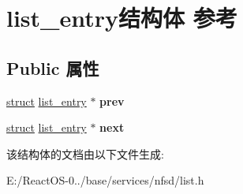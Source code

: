 \hypertarget{structlist__entry}{}\section{list\+\_\+entry结构体 参考}
\label{structlist__entry}
\subsection*{Public 属性}
\begin{DoxyCompactItemize}
\item 
\mbox{\label{structlist__entry_aa400c402bee52d2ccf9cbf834276ce85}} 
\hyperlink{interfacestruct}{struct} \hyperlink{structlist__entry}{list\+\_\+entry} $\ast$ {\bfseries prev}
\item 
\mbox{\label{structlist__entry_a0b1439db2d6f56fac7b7c87fb6261cb9}} 
\hyperlink{interfacestruct}{struct} \hyperlink{structlist__entry}{list\+\_\+entry} $\ast$ {\bfseries next}
\end{DoxyCompactItemize}


该结构体的文档由以下文件生成\+:\begin{DoxyCompactItemize}
\item 
E\+:/\+React\+O\+S-\/0../base/services/nfsd/list.\+h\end{DoxyCompactItemize}
